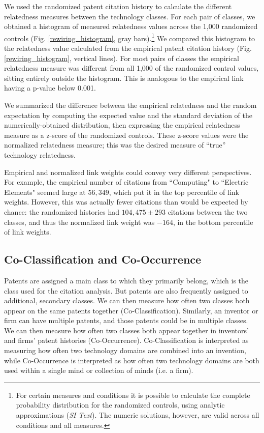 \documentclass[pre,reprint,groupedaddress,superscriptaddress]{revtex4-1}
\begin{document}
We used the randomized patent citation history to calculate the different relatedness measures between the technology classes. For each pair of classes, we obtained a histogram of measured relatedness values across the 1,000 randomized controls (Fig. \ref{rewiring_histogram}, gray bars).\footnote{For certain measures and conditions it is possible to calculate the complete probability distribution for the randomized controls, using analytic approximations 
(\textit{SI Text}). The numeric solutions, however, are valid across all conditions and all measures.} We compared this histogram to the relatedness value calculated from the empirical patent citation history (Fig. \ref{rewiring_histogram}, vertical lines). For most pairs of classes the empirical relatedness measure was different from all 1,000 of the randomized control values, sitting entirely outside the histogram. This is analogous to the empirical link having a p-value below 0.001.

We summarized the difference between the empirical relatedness and the random expectation by computing the expected value and the standard deviation of the numerically-obtained distribution, then expressing the empirical relatedness measure as a z-score of the randomized controls. These z-score values were the normalized relatedness measure; this was the desired measure of ``true'' technology relatedness. 

Empirical and normalized link weights could convey very different perspectives.
For example, the empirical number of citations from ``Computing" to ``Electric Elements" seemed large at $56,349$, which put it in the top percentile of link weights. However, this was actually fewer citations than would be expected by chance: the randomized histories had $104,475 \pm 293$ citations between the two classes, and thus the normalized link weight was $-164$, in the bottom percentile of link weights.

\subsection{Co-Classification and Co-Occurrence}
Patents are assigned a main class to which they primarily belong, which is the class used for the citation analysis. But patents are also frequently assigned to additional, secondary classes. We can then measure how often two classes both appear on the same patents together (Co-Classification). Similarly, an inventor or firm can have multiple patents, and those patents could be in multiple classes. We can then measure how often two classes both appear together in inventors' and firms' patent histories (Co-Occurrence). Co-Classification is interpreted as measuring how often two technology domains are combined into an invention, while Co-Occurrence is interpreted as how often two technology domains are both used within a single mind or collection of minds (i.e. a firm). 
\end{document}
